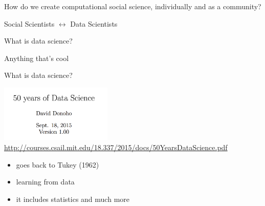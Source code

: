 \documentclass{beamer}
\def\vf{\vfill}
\begin{document}
\begin{frame}

\begin{center}
\LARGE{How do we create computational social science, individually and as a community?}
\end{center}

\end{frame}
\begin{frame}

\begin{center}
\LARGE{Social Scientists $\longleftrightarrow$ Data Scientists}
\end{center}

\end{frame}
\begin{frame}

\begin{center}
\LARGE{What is data science?}
\end{center}

\end{frame}
\begin{frame}

\begin{center}
\LARGE{Anything that's cool}
\end{center}

\end{frame}
\begin{frame}

\begin{center}
\LARGE{What is data science?}
\end{center}

\end{frame}
\begin{frame}

\begin{center}
\includegraphics[width=0.4\textwidth]{figures/donoho_50_2015_title.png}\\
\tiny{\textcolor{blue}{\url{http://courses.csail.mit.edu/18.337/2015/docs/50YearsDataScience.pdf}}}
\end{center}
\pause
\vf
\begin{itemize}
\item goes back to Tukey (1962)
\pause
\item learning from data
\pause
\item it includes statistics and much more
\end{itemize}

\end{frame}
\end{document}
